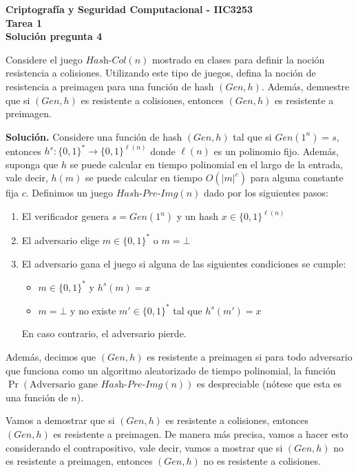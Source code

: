 \documentclass[11pt]{article}
\begin{document}
\begin{center}
  \bf Criptografía y Seguridad Computacional - IIC3253\\
  \bf Tarea 1\\
  \bf Solución pregunta 4
\end{center}


\bigskip

\noindent
Considere el juego $\textit{Hash-Col}(n)$ mostrado en clases para definir la noción resistencia a colisiones. Utilizando este tipo de juegos, defina la noción de resistencia a preimagen para una función de hash $(\textit{Gen}, h)$. Además, demuestre que si $(\textit{Gen}, h)$ es resistente a colisiones, entonces $(\textit{Gen}, h)$ es resistente a preimagen.

\bigskip

\noindent
    {\bf Solución.}
Considere una función de hash $(\textit{Gen},h)$ tal que si $\textit{Gen}(1^n) = s$, entonces $h^s
: \{0,1\}^* \to \{0,1\}^{\ell(n)}$ donde $\ell(n)$ es un polinomio
fijo. Además, suponga que $h$ se puede calcular en tiempo polinomial en el largo de la entrada, vale decir, $h(m)$ se puede calcular en tiempo $O(|m|^c)$ para alguna constante fija $c$. Definimos un juego $\textit{Hash-Pre-Img}(n)$ dado por los siguientes pasos:
\begin{enumerate}
\item El verificador genera $s = \textit{Gen}(1^n)$ y un hash $x \in \{0,1\}^{\ell(n)}$
\item El adversario elige $m \in \{0,1\}^*$ o $m = \bot$
\item El adversario gana el juego si alguna de las siguientes condiciones se cumple:
\begin{itemize}
\item $m \in \{0,1\}^{*}$ y $h^s(m) = x$ 
\item $m = \bot$ y  no existe $m' \in \{0,1\}^*$ tal que $h^s(m') = x$
\end{itemize}
En caso contrario, el adversario pierde.
\end{enumerate}
Además, decimos que $(\textit{Gen},h)$ es resistente a preimagen si
para todo adversario que funciona como un algoritmo aleatorizado de
tiempo polinomial, la función $\Pr(\text{Adversario gane }
\textit{Hash-Pre-Img}(n))$ es despreciable (nótese que esta es una
función de $n$).

Vamos a demostrar que si $(\textit{Gen},h)$ es resistente a
colisiones, entonces $(\textit{Gen},h)$ es resistente a preimagen. De
manera más precisa, vamos a hacer esto considerando el contrapositivo,
vale decir, vamos a mostrar que si $(\textit{Gen},h)$ no es resistente
a preimagen, entonces $(\textit{Gen},h)$ no es resistente a
colisiones.
\end{document}
